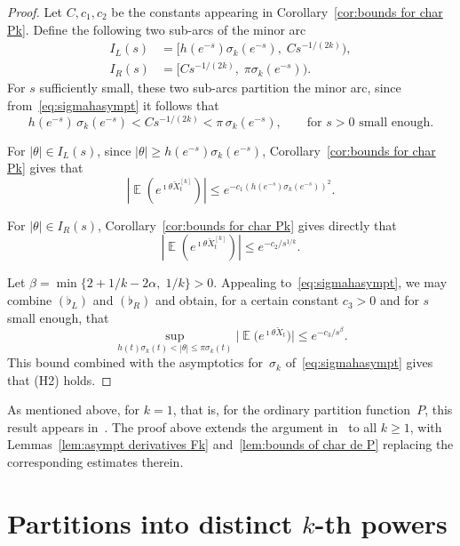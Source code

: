 \documentclass[12pt]{amsart}
\theoremstyle{definition}
\DeclareMathOperator{\E}{\mathbb{E}}
\begin{document}
\begin{proof}
Let $C, c_1, c_2$ be the constants appearing in Corollary~\ref{cor:bounds for char Pk}. Define the following two
sub-arcs of the minor arc
\begin{align*}
I_L(s) &= \big[h(e^{-s})\sigma_k(e^{-s}),\; C s^{-1/(2k)}\big),\\
I_R(s) &= \big[C s^{-1/(2k)},\; \pi\sigma_k(e^{-s})\big).
\end{align*}
For $s$ sufficiently small, these two sub-arcs partition the minor arc, since from~\eqref{eq:sigmahasympt} it
follows that
\begin{equation}\label{eq:arcpartition}
h(e^{-s})\,\sigma_k(e^{-s}) < C s^{-1/(2k)} < \pi\,\sigma_k(e^{-s}), \qquad \text{for  } s>0 \text{ small enough}.
\end{equation}

For $|\theta|\in I_L(s)$, since $|\theta|\ge h(e^{-s})\sigma_k(e^{-s})$, Corollary~\ref{cor:bounds for char Pk} gives that
\begin{equation}\tag{$\flat_L$}
|\E(e^{\imath\theta\breve{X}^{[k]}_t})| \le e^{-c_1(h(e^{-s})\sigma_k(e^{-s}))^2}.
\end{equation}

For $|\theta|\in I_R(s)$, Corollary~\ref{cor:bounds for char Pk} gives directly that
\begin{equation}\tag{$\flat_R$}
|\E(e^{\imath\theta\breve{X}^{[k]}_t})| \le e^{-c_2/s^{1/k}}.
\end{equation}

Let $\beta = \min\{2+1/k-2\alpha,\; 1/k\} > 0$. Appealing to~\eqref{eq:sigmahasympt}, we may combine $(\flat_L)$ and
$(\flat_R)$ and obtain, for a certain constant $c_3>0$ and for $s$ small enough, that
\[
\sup_{h(t)\sigma_k(t)<|\theta|\le\pi\sigma_k(t)} \big|\E\!\big(e^{\imath\theta\breve{X}_t}\big)\big| \le e^{-c_3/s^{\beta}}.
\]
This bound combined with the asymptotics for~$\sigma_k$ of~\eqref{eq:sigmahasympt} gives that (H2) holds.
\end{proof}

As mentioned above, for $k=1$, that is, for the ordinary partition function~$P$, this
result appears in~\cite[Thm.~6.2]{CFMK}. The proof above extends the argument in~\cite{CFMK} to all
$k\ge 1$, with Lemmas~\ref{lem:asympt derivatives Fk} and~\ref{lem:bounds of char de P} replacing the corresponding estimates therein.


\section{Partitions into distinct $k$-th powers}\label{sec:distinct}
\end{document}
